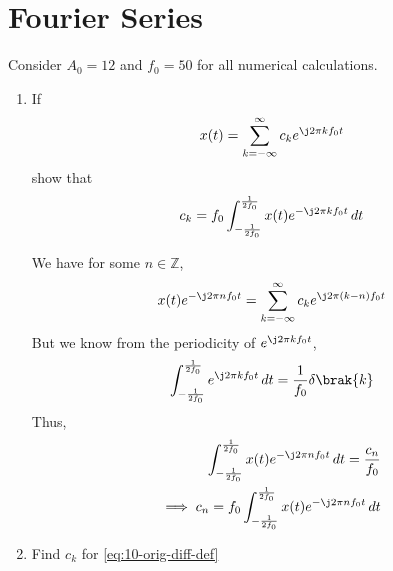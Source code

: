 \documentclass[journal,12pt,twocolumn]{IEEEtran}
\renewcommand\thesection{\arabic{section}}
\begin{document}
\section{Fourier Series}
Consider $A_0 =12$ and $f_0 = 50$ for all numerical calculations.
\begin{enumerate}[label=\thesection.\arabic*,ref=\thesection.\theenumi]
\item If
\begin{align}
	x(t) = \sum_{k = -\infty}^{\infty}c_ke^{\j2\pi kf_0 t}
\label{eq:one-Z-complex}
\end{align}
show that 
\begin{align}
	c_k = f_0\int_{-\frac{1}{2f_0}}^{\frac{1}{2f_0}}x(t)e^{-\j2\pi kf_0 t}\, dt
\label{eq:one-Z}
\end{align}

\solution We have for some $n \in \mathbb{Z}$,
\begin{align}
    x(t)e^{-\j2\pi nf_0t} = \sum_{k = -\infty}^{\infty}c_ke^{\j2\pi (k - n)f_0 t}
\end{align}
But we know from the periodicity of $e^{\j2\pi kf_0t}$,
\begin{align}
    \int_{-\frac{1}{2f_0}}^{\frac{1}{2f_0}}e^{\j2\pi kf_0 t}\, dt = 
    \frac{1}{f_0}\delta\brak{k} 
\end{align}
Thus,
\begin{align}
    \int_{-\frac{1}{2f_0}}^{\frac{1}{2f_0}}x(t)e^{-\j2\pi nf_0 t}\, dt = 
    \frac{c_n}{f_0} \\
    \implies c_n = f_0\int_{-\frac{1}{2f_0}}^{\frac{1}{2f_0}}x(t)e^{-\j2\pi nf_0 t}\, dt 
\end{align}
\item Find $c_k$ for \eqref{eq:10-orig-diff-def}


\end{enumerate}
\end{document}
